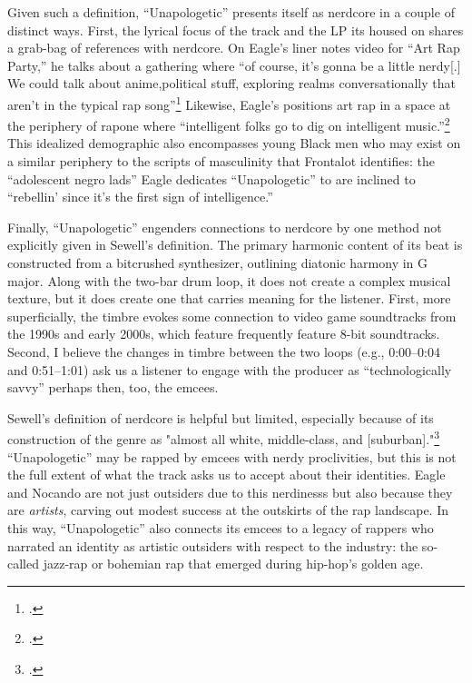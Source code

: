 Given such a definition, ``Unapologetic'' presents itself as nerdcore in a couple of distinct ways. First, the lyrical 
focus of the track and the LP its housed on shares a grab-bag of references with nerdcore. On Eagle's liner notes video
for ``Art Rap Party,'' he talks about a gathering where ``of course, it's gonna be a little nerdy[.] \textellipsis We 
could talk about anime,\textellipsis political stuff, exploring realms conversationally that aren't in the typical rap 
song''\footnote{
    \cite{openmikeeagleVideoLinerNotes2010}.}
Likewise, Eagle's positions art rap in a space at the periphery of rap\textemdash one where ``intelligent folks go to 
dig on intelligent music.''\footnote{
    \cite{openmikeeagleVideoLinerNotes2010}.} 
This idealized demographic also encompasses young Black men who may exist on a similar periphery to the scripts of 
masculinity that Frontalot identifies: the ``adolescent negro lads'' Eagle dedicates ``Unapologetic'' to are inclined 
to ``rebellin' since it's the first sign of intelligence.''

Finally, ``Unapologetic'' engenders connections to nerdcore by one method not explicitly given in Sewell's definition. 
The primary harmonic content of its beat is constructed from a bitcrushed synthesizer, outlining diatonic harmony in G 
major. Along with the two-bar drum loop, it does not create a complex musical texture, but it does create one that carries
meaning for the listener. First, more superficially, the timbre evokes some connection to video game soundtracks from the 
1990s and early 2000s, which feature frequently feature 8-bit soundtracks. Second, I believe the changes in timbre between
the two loops (e.g., 0:00--0:04 and 0:51--1:01) ask us a listener to engage with the producer as ``technologically savvy''\textemdash
perhaps then, too, the emcees.

Sewell's definition of nerdcore is helpful but limited, especially because of its construction of the genre as "almost all 
white, middle-class, and [suburban]."\footnote{
    \autocite[223]{amandasewellNerdcoreHiphop2015}.} 
``Unapologetic'' may be rapped by emcees with nerdy proclivities, but this is not the full extent of what the track asks us
to accept about their identities. Eagle and Nocando are not just outsiders due to this nerdinesss but also because they are
\emph{artists}, carving out modest success at the outskirts of the rap landscape. In this way, ``Unapologetic'' also connects
its emcees to a legacy of rappers who narrated an identity as artistic outsiders with respect to the industry: the so-called
jazz-rap or bohemian rap that emerged during hip-hop's golden age.

